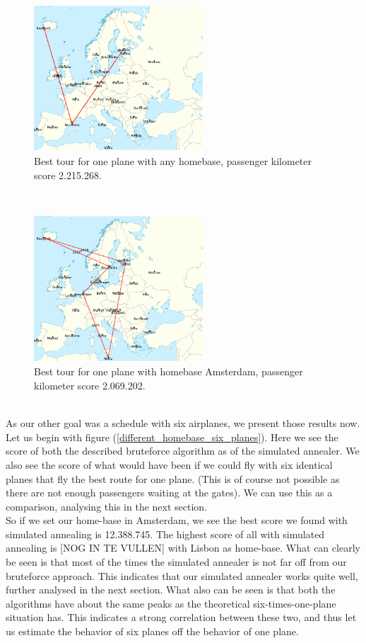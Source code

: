 \documentclass[journal]{IEEEtran}
\begin{document}
\\
\begin{figure}[!h]
\centering
\includegraphics[width=2.5in]{best_tour_one_plane}
\caption{Best tour for one plane with any homebase, passenger kilometer score 2.215.268.}
\label{fig:one_plane}
\end{figure}
\\
\begin{figure}[!h]
\centering
\includegraphics[width=2.5in]{best_tour_one_plane_amsterdam}
\caption{Best tour for one plane with homebase Amsterdam, passenger kilometer score 2.069.202.}
\label{fig:one_plane_amsterdam}
\end{figure}
\\
As our other goal was a schedule with six airplanes, we present those results now. Let us begin with figure (\ref{different_homebase_six_planes}). Here we see the score of both the described bruteforce algorithm as of the simulated annealer. We also see the score of what would have been if we could fly with six identical planes that fly the best route for one plane. (This is of course not possible as there are not enough passengers waiting at the gates). We can use this as a comparison, analysing this in the next section. \\
So if we set our home-base in Amsterdam, we see the best score we found with simulated annealing is 12.388.745. The highest score of all with simulated annealing is [NOG IN TE VULLEN] with Lisbon as home-base. What can clearly be seen is that most of the times the simulated annealer is not far off from our bruteforce approach. This indicates that our simulated annealer works quite well, further analysed in the next section. What also can be seen is that both the algorithms have about the same peaks as the theoretical six-times-one-plane situation has. This indicates a strong correlation between these two, and thus let us estimate the behavior of six planes off the behavior of one plane.
\end{document}
